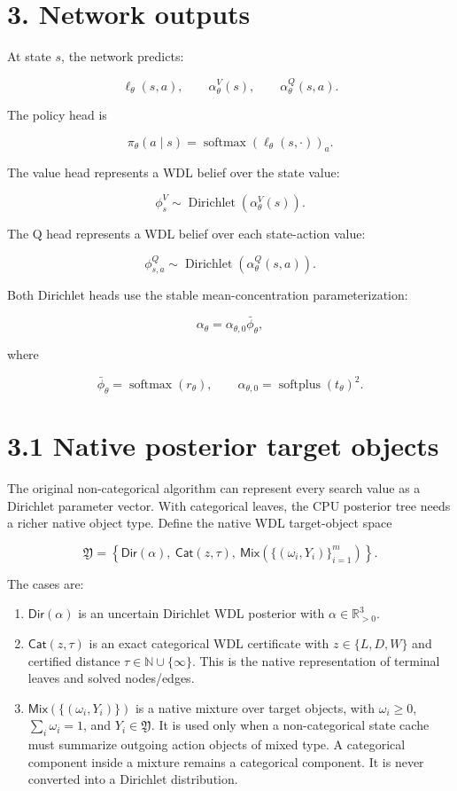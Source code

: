 \documentclass[11pt]{article}
\newcommand{\R}{\mathbb{R}}
\newcommand{\Dir}{\operatorname{Dirichlet}}
\newcommand{\softmax}{\operatorname{softmax}}
\newcommand{\softplus}{\operatorname{softplus}}
\newcommand{\N}{\mathbb{N}}
\newcommand{\Native}{\mathfrak{Y}}
\newcommand{\DirObj}{\mathsf{Dir}}
\newcommand{\CatObj}{\mathsf{Cat}}
\newcommand{\MixObj}{\mathsf{Mix}}
\begin{document}
\section*{3. Network outputs}

At state \(s\), the network predicts:

\[
\ell_\theta(s,a),
\qquad
\alpha_\theta^V(s),
\qquad
\alpha_\theta^Q(s,a).
\]

The policy head is

\[
\pi_\theta(a \mid s)
=
\softmax(\ell_\theta(s,\cdot))_a.
\]

The value head represents a WDL belief over the state value:

\[
\phi_s^V
\sim
\Dir(\alpha_\theta^V(s)).
\]

The Q head represents a WDL belief over each state-action value:

\[
\phi_{s,a}^Q
\sim
\Dir(\alpha_\theta^Q(s,a)).
\]

Both Dirichlet heads use the stable mean-concentration parameterization:

\[
\alpha_\theta
=
\alpha_{\theta,0}\bar{\phi}_\theta,
\]

where

\[
\bar{\phi}_\theta = \softmax(r_\theta),
\qquad
\alpha_{\theta,0} = \softplus(t_\theta)^2.
\]



\section*{3.1 Native posterior target objects}

The original non-categorical algorithm can represent every search value as a
Dirichlet parameter vector. With categorical leaves, the CPU posterior tree needs
a richer native object type. Define the native WDL target-object space

\[
\Native
=
\left\{
\DirObj(\alpha),\ \CatObj(z,\tau),\ \MixObj\left(\{(\omega_i,Y_i)\}_{i=1}^m\right)
\right\}.
\]

The cases are:

\begin{enumerate}[leftmargin=2em]
  \item \(\DirObj(\alpha)\) is an uncertain Dirichlet WDL posterior with
  \(\alpha\in\R_{>0}^3\).

  \item \(\CatObj(z,\tau)\) is an exact categorical WDL certificate with
  \(z\in\{L,D,W\}\) and certified distance \(\tau\in\N\cup\{\infty\}\). This is
  the native representation of terminal leaves and solved nodes/edges.

  \item \(\MixObj(\{(\omega_i,Y_i)\})\) is a native mixture over target objects,
  with \(\omega_i\ge 0\), \(\sum_i\omega_i=1\), and \(Y_i\in\Native\). It is
  used only when a non-categorical state cache must summarize outgoing action
  objects of mixed type. A categorical component inside a mixture remains a
  categorical component. It is never converted into a Dirichlet distribution.
\end{enumerate}
\end{document}
